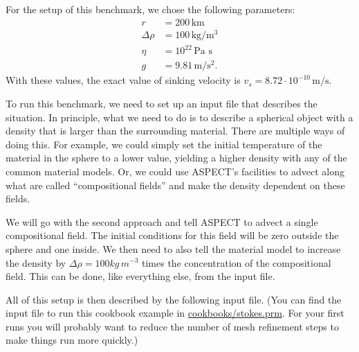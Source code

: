 \documentclass{article}
\newcommand{\aspect}{\textsc{ASPECT}}
\begin{document}
For the setup of this benchmark, we chose the following parameters:
\begin{align*}
  \label{eq:stokes-parameters}
  r &= 200 \, \text{km}\\
  \Delta\rho &= 100 \, \text{kg}/\text{m}^3\\
  \eta &= 10^{22} \, \text{Pa s}\\
  g &= 9.81 \, \text{m}/\text{s}^2.
\end{align*}
With these values, the exact value of sinking velocity is $v_s =
8.72 \cdot 10^{-10} \, \text{m}/\text{s}$.

To run this benchmark, we need to set up an input file that describes the
situation. In principle, what we need to do is to describe a spherical object
with a density that is larger than the surrounding material. There are multiple
ways of doing this. For example, we could simply set the initial temperature of
the material in the sphere to a lower value, yielding a higher density with any
of the common material models. Or, we could use \aspect{}'s facilities to advect
along what are called ``compositional fields'' and make the density dependent on
these fields.

We will go with the second approach and tell \aspect{} to advect a single
compositional field. The initial conditions for this field will be zero outside
the sphere and one inside. We then need to also tell the material model to
increase the density by $\Delta\rho=100 kg\, m^{-3}$ times the concentration of
the compositional field. This can be done, like everything else, from the input
file.

All of this setup is then described by the following input file.
(You can find the input file to run this cookbook example in
\url{cookbooks/stokes.prm}. For your first runs you will probably want to
reduce the number of mesh refinement steps to make things run more quickly.)


\end{document}
